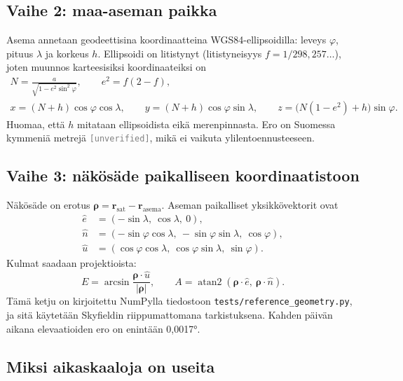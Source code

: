 \documentclass[a4paper,11pt]{article}
\newcommand{\unverified}[1][]{\textcolor{gray}{\texttt{[unverified#1]}}}
\newcommand{\koodi}[1]{\texttt{#1}}
\begin{document}
\subsection{Vaihe 2: maa-aseman paikka}

Asema annetaan geodeettisina koordinaatteina WGS84-ellipsoidilla: leveys $\varphi$, pituus $\lambda$ ja korkeus $h$. Ellipsoidi on litistynyt (litistyneisyys $f = 1/298{,}257\ldots$), joten muunnos karteesisiksi koordinaateiksi on
\begin{gather*}
N = \frac{a}{\sqrt{1-e^2\sin^2\varphi}},\qquad e^2 = f(2-f),\\
x = (N+h)\cos\varphi\cos\lambda,\qquad y = (N+h)\cos\varphi\sin\lambda,\qquad z = \bigl(N(1-e^2)+h\bigr)\sin\varphi .
\end{gather*}
Huomaa, että $h$ mitataan ellipsoidista eikä merenpinnasta. Ero on Suomessa kymmeniä metrejä \unverified, mikä ei vaikuta ylilentoennusteeseen.

\subsection{Vaihe 3: näkösäde paikalliseen koordinaatistoon}

Näkösäde on erotus $\boldsymbol\rho = \mathbf r_\text{sat} - \mathbf r_\text{asema}$. Aseman paikalliset yksikkövektorit ovat
\begin{align*}
\hat e &= (-\sin\lambda,\ \cos\lambda,\ 0),\\
\hat n &= (-\sin\varphi\cos\lambda,\ -\sin\varphi\sin\lambda,\ \cos\varphi),\\
\hat u &= (\cos\varphi\cos\lambda,\ \cos\varphi\sin\lambda,\ \sin\varphi).
\end{align*}
Kulmat saadaan projektioista:
\[
E = \arcsin\frac{\boldsymbol\rho\cdot\hat u}{|\boldsymbol\rho|},\qquad
A = \operatorname{atan2}(\boldsymbol\rho\cdot\hat e,\ \boldsymbol\rho\cdot\hat n).
\]
Tämä ketju on kirjoitettu NumPylla tiedostoon \koodi{tests/reference\_geometry.py}, ja sitä käytetään Skyfieldin riippumattomana tarkistuksena. Kahden päivän aikana elevaatioiden ero on enintään 0,0017°.

\subsection{Miksi aikaskaaloja on useita}
\end{document}
